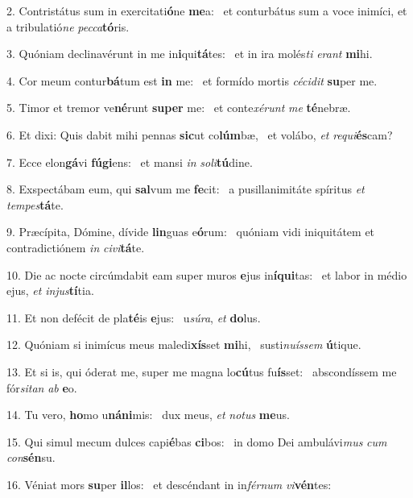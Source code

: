 2. Contristátus sum in exercitati\textbf{ó}ne \textbf{me}a: \ast\  et conturbátus sum a voce inimíci, et a tribulatió\textit{ne} \textit{pec}\textit{ca}\textbf{tó}ris.\

3. Quóniam declinavérunt in me in\textbf{i}qui\textbf{tá}tes: \ast\  et in ira molés\textit{ti} \textit{e}\textit{rant} \textbf{mi}hi.\

4. Cor meum contur\textbf{bá}tum est \textbf{in} me: \ast\  et formído mortis \textit{cé}\textit{ci}\textit{dit} \textbf{su}per me.\

5. Timor et tremor ve\textbf{né}runt \textbf{su}\textbf{per} me: \ast\  et conte\textit{xé}\textit{runt} \textit{me} \textbf{té}nebræ.\

6. Et dixi: Quis dabit mihi pennas \textbf{sic}ut co\textbf{lúm}bæ, \ast\  et volábo, \textit{et} \textit{re}\textit{qui}\textbf{és}cam?\

7. Ecce elon\textbf{gá}vi \textbf{fú}\textbf{gi}ens: \ast\  et mansi \textit{in} \textit{so}\textit{li}\textbf{tú}dine.\

8. Exspectábam eum, qui \textbf{sal}vum me \textbf{fe}cit: \ast\  a pusillanimitáte spíritus \textit{et} \textit{tem}\textit{pes}\textbf{tá}te.\

9. Præcípita, Dómine, dívide \textbf{lin}guas e\textbf{ó}rum: \ast\  quóniam vidi iniquitátem et contradictiónem \textit{in} \textit{ci}\textit{vi}\textbf{tá}te.\

10. Die ac nocte circúmdabit eam super muros \textbf{e}jus in\textbf{í}\textbf{qui}tas: \ast\  et labor in médio ejus, \textit{et} \textit{in}\textit{jus}\textbf{tí}tia.\

11. Et non defécit de pla\textbf{té}is \textbf{e}jus: \ast\  u\textit{sú}\textit{ra}, \textit{et} \textbf{do}lus.\

12. Quóniam si inimícus meus maledi\textbf{xís}set \textbf{mi}hi, \ast\  susti\textit{nu}\textit{ís}\textit{sem} \textbf{ú}tique.\

13. Et si is, qui óderat me, super me magna lo\textbf{cú}tus fu\textbf{ís}set: \ast\  abscondíssem me fór\textit{si}\textit{tan} \textit{ab} \textbf{e}o.\

14. Tu vero, \textbf{ho}mo u\textbf{ná}\textbf{ni}mis: \ast\  dux meus, \textit{et} \textit{no}\textit{tus} \textbf{me}us.\

15. Qui simul mecum dulces capi\textbf{é}bas \textbf{ci}bos: \ast\  in domo Dei ambulávi\textit{mus} \textit{cum} \textit{con}\textbf{sén}su.\

16. Véniat mors \textbf{su}per \textbf{il}los: \ast\  et descéndant in in\textit{fér}\textit{num} \textit{vi}\textbf{vén}tes:\

